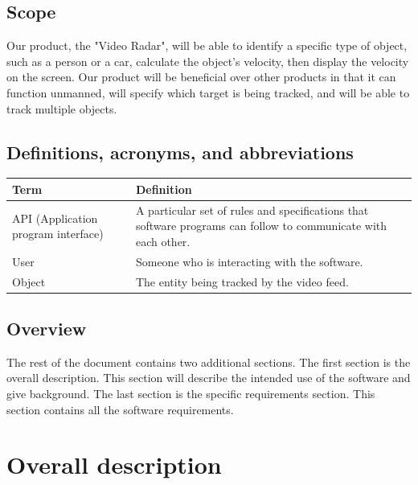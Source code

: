 \documentclass[letterpaper,10pt,onecolumn,draftclsnofoot]{IEEEtran}
\begin{document}
\subsection{Scope}
Our product, the "Video Radar", will be able to identify a specific type of object, such as a person or a car, calculate the object's velocity, then display the velocity on the screen.
Our product will be beneficial over other products in that it can function unmanned, will specify which target is being tracked, and will be able to track multiple objects.
\subsection{Definitions, acronyms, and abbreviations}
\begin{tabular}{|p{4cm}|p{12cm}|}
	\hline
	\textbf{Term} & \textbf{Definition} \\
	\hline
	API (Application program interface) & A particular set of rules and specifications that software programs can follow to communicate with each other. \\
	\hline
	User & Someone who is interacting with the software. \\
	\hline
	Object & The entity being tracked by the video feed.  \\
	\hline
	
\end{tabular}



\subsection{Overview}
The rest of the document contains two additional sections.
The first section is the overall description.
This section will describe the intended use of the software and give background.
The last section is the specific requirements section.
This section contains all the software requirements.

\section{Overall description}
\end{document}
